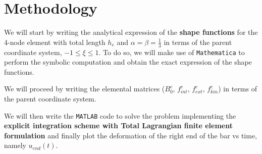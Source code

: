 \section{Methodology}
\label{sec:methodology}

We will start by writing the analytical expression of the \textbf{shape functions} for the 4-node element with total length $h_e$ and $\alpha = \beta = \frac{1}{3}$ in terms of the parent coordinate system, $-1 \leq \xi \leq 1$.
To do so, we will make use of \texttt{Mathematica} to perform the symbolic computation and obtain the exact expression of the shape functions.

We will proceed by writing the elemental matrices ($B_0^e$, $f_{int}^e$, $f_{ext}^e$, $f_{kin}^e$) in terms of the parent coordinate system.

We will then write the \texttt{MATLAB} code to solve the problem implementing the \textbf{explicit integration scheme with Total Lagrangian finite element formulation} and finally plot the deformation of the right end of the bar vs time, namely $u_{end}(t)$.